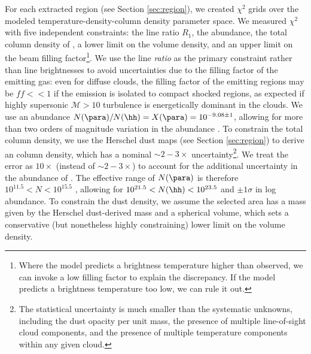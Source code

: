 For each extracted region (see Section \ref{sec:region}), we created $\chi^2$
grids over the modeled temperature-density-column density parameter space.  We
measured $\chi^2$ with five independent constraints: the line ratio $R_1$, the
\formaldehyde abundance, the total column density of \hh, a lower limit on the
\hh volume density, and an upper limit on the beam filling
factor\footnote{Where the model predicts a brightness temperature higher than
observed, we can invoke a low filling factor to explain the discrepancy.  If
the model predicts a brightness temperature too low,
we can rule it out.}.  We use the
line \emph{ratio} as the primary constraint rather than line brightnesses to
avoid uncertainties due to the filling factor of the emitting gas: even for
diffuse clouds, the filling factor of the emitting regions may be $ff<<1$ if
the emission is isolated to compact shocked regions, as expected if highly
supersonic $\mathcal{M}>10$ turbulence is energetically dominant in the clouds.
We use an abundance $N(\para)/N(\hh) = X(\para) =
10^{-9.08\pm1}$, allowing for more than two orders of magnitude variation in
the \formaldehyde abundance
\citep{Ginsburg2013a, Carey1998a, Wootten1978a, Mundy1987a}.  To constrain the
total column density, we use the Herschel dust maps (see Section
\ref{sec:region}) to derive an \hh column
density, which has a nominal $\sim2-3\times$ uncertainty\footnote{The
statistical uncertainty is much smaller than the systematic unknowns, including
the dust opacity per unit mass, the presence of multiple line-of-sight cloud
components, and the presence of multiple temperature components within any
given cloud.}.  We treat the error as $10\times$ (instead of $\sim2-3\times$)
to account for the additional uncertainty in the abundance of \para.
The effective range of $N(\para)$ is therefore $10^{11.5} < N < 10^{15.5}$
\persc, allowing for $10^{21.5} < N(\hh) < 10^{23.5}$ \persc and $\pm1\sigma$
in log abundance.
To
constrain the dust density, we assume the selected area has a mass given by the
Herschel dust-derived mass and a spherical volume, which sets a conservative
(but nonetheless highly constraining) lower limit on the volume density.


